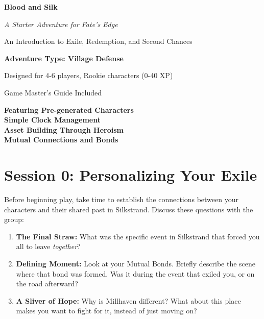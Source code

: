\documentclass[11pt]{article}
\begin{document}
\begin{titlepage}
\centering
\vspace*{2cm}

{\Huge\bfseries\color{headercolor} Blood and Silk} 

\vspace{0.5cm}

{\Large\itshape A Starter Adventure for Fate's Edge}

\vspace{1cm}

{\large An Introduction to Exile, Redemption, and Second Chances}

\vspace{2cm}

{\Large\bfseries Adventure Type: Village Defense}

\vspace{1cm}

{\large Designed for 4-6 players, Rookie characters (0-40 XP)}

\vspace{1cm}

{\large Game Master's Guide Included}

\vfill

{\large 
\textbf{Featuring Pre-generated Characters} \\
\textbf{Simple Clock Management} \\
\textbf{Asset Building Through Heroism} \\
\textbf{Mutual Connections and Bonds}
}

\end{titlepage}

\newpage

\tableofcontents

\newpage

\section{Session 0: Personalizing Your Exile}

Before beginning play, take time to establish the connections between your characters and their shared past in Silkstrand. Discuss these questions with the group:

\begin{enumerate}
\item \textbf{The Final Straw:} What was the specific event in Silkstrand that forced you all to leave \textit{together}?
\item \textbf{Defining Moment:} Look at your Mutual Bonds. Briefly describe the scene where that bond was formed. Was it during the event that exiled you, or on the road afterward?
\item \textbf{A Sliver of Hope:} Why is Millhaven different? What about this place makes you want to fight for it, instead of just moving on?
\end{enumerate}
\end{document}
